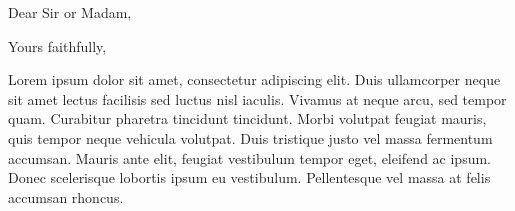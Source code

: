 \documentclass[12pt,a4paper,sans]{moderncv}   %
\begin{document}





\clearpage
\date{January 01, 1984}
\opening{Dear Sir or Madam,}
\closing{Yours faithfully,}
\makelettertitle

Lorem ipsum dolor sit amet, consectetur adipiscing elit. Duis ullamcorper neque sit amet lectus facilisis sed luctus nisl iaculis. Vivamus at neque arcu, sed tempor quam. Curabitur pharetra tincidunt tincidunt. Morbi volutpat feugiat mauris, quis tempor neque vehicula volutpat. Duis tristique justo vel massa fermentum accumsan. Mauris ante elit, feugiat vestibulum tempor eget, eleifend ac ipsum. Donec scelerisque lobortis ipsum eu vestibulum. Pellentesque vel massa at felis accumsan rhoncus.
\end{document}
